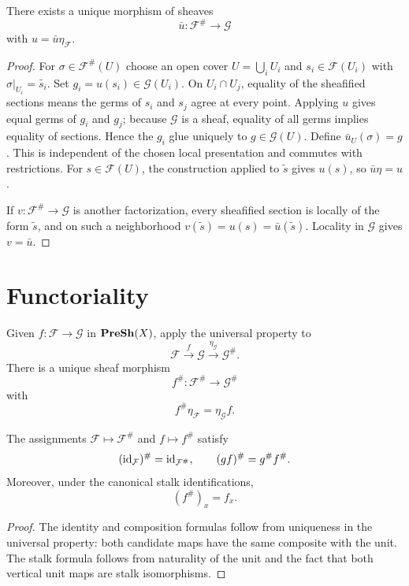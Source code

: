 \begin{theorem}
There exists a unique morphism of sheaves
\[
\bar u:\mathcal F^\#\longrightarrow\mathcal G
\]
with $u=\bar u\eta_{\mathcal F}$.
\end{theorem}
\begin{proof}
For $\sigma\in\mathcal F^\#(U)$ choose an open cover $U=\bigcup_iU_i$ and
$s_i\in\mathcal F(U_i)$ with $\sigma|_{U_i}=\widetilde{s_i}$.  Set
$g_i=u(s_i)\in\mathcal G(U_i)$.  On $U_i\cap U_j$, equality of the sheafified sections
means the germs of $s_i$ and $s_j$ agree at every point.  Applying $u$ gives equal germs of
$g_i$ and $g_j$; because $\mathcal G$ is a sheaf, equality of all germs implies equality of
sections.  Hence the $g_i$ glue uniquely to $g\in\mathcal G(U)$.  Define
$\bar u_U(\sigma)=g$.  This is independent of the chosen local presentation and commutes
with restrictions.  For $s\in\mathcal F(U)$, the construction applied to $\widetilde s$
gives $u(s)$, so $\bar u\eta=u$.

If $v:\mathcal F^\#\to\mathcal G$ is another factorization, every sheafified section is
locally of the form $\widetilde s$, and on such a neighborhood
$v(\widetilde s)=u(s)=\bar u(\widetilde s)$.  Locality in $\mathcal G$ gives $v=\bar u$.
\end{proof}

\section{Functoriality}

Given $f:\mathcal F\to\mathcal G$ in $\mathbf{PreSh}(X)$, apply the universal property to
\[
\mathcal F\xrightarrow{f}\mathcal G\xrightarrow{\eta_{\mathcal G}}\mathcal G^\#.
\]
There is a unique sheaf morphism
\[
f^\#:\mathcal F^\#\longrightarrow\mathcal G^\#
\]
with
\[
f^\#\eta_{\mathcal F}=\eta_{\mathcal G}f.
\]



\begin{proposition}
The assignments $\mathcal F\mapsto\mathcal F^\#$ and $f\mapsto f^\#$ satisfy
\[
(\operatorname{id}_{\mathcal F})^\#=\operatorname{id}_{\mathcal F^\#},
\qquad
(gf)^\#=g^\#f^\#.
\]
Moreover, under the canonical stalk identifications,
\[
(f^\#)_x=f_x.
\]
\end{proposition}
\begin{proof}
The identity and composition formulas follow from uniqueness in the universal property:
both candidate maps have the same composite with the unit.  The stalk formula follows from
naturality of the unit and the fact that both vertical unit maps are stalk isomorphisms.
\end{proof}

